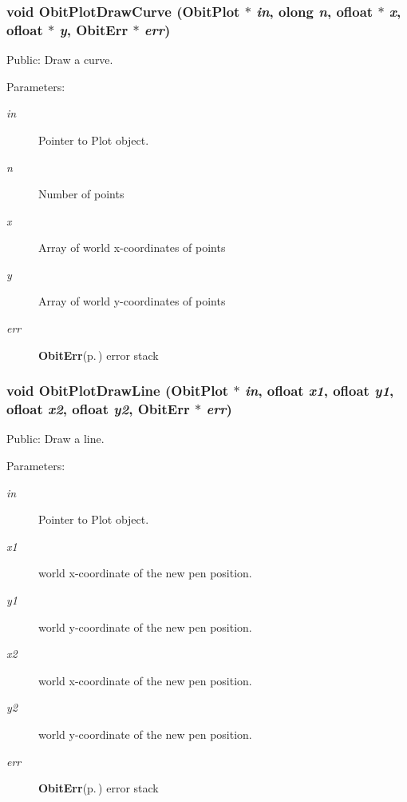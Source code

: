 \subsubsection{\setlength{\rightskip}{0pt plus 5cm}void Obit\-Plot\-Draw\-Curve ({\bf Obit\-Plot} $\ast$ {\em in}, {\bf olong} {\em n}, {\bf ofloat} $\ast$ {\em x}, {\bf ofloat} $\ast$ {\em y}, {\bf Obit\-Err} $\ast$ {\em err})}\label{ObitPlot_8c_a29}


Public: Draw a curve. 

\begin{Desc}
\item[Parameters:]
\begin{description}
\item[{\em in}]Pointer to Plot object. \item[{\em n}]Number of points \item[{\em x}]Array of world x-coordinates of points \item[{\em y}]Array of world y-coordinates of points \item[{\em err}]{\bf Obit\-Err}{\rm (p.\,\pageref{structObitErr})} error stack \end{description}
\end{Desc}
\subsubsection{\setlength{\rightskip}{0pt plus 5cm}void Obit\-Plot\-Draw\-Line ({\bf Obit\-Plot} $\ast$ {\em in}, {\bf ofloat} {\em x1}, {\bf ofloat} {\em y1}, {\bf ofloat} {\em x2}, {\bf ofloat} {\em y2}, {\bf Obit\-Err} $\ast$ {\em err})}\label{ObitPlot_8c_a27}


Public: Draw a line. 

\begin{Desc}
\item[Parameters:]
\begin{description}
\item[{\em in}]Pointer to Plot object. \item[{\em x1}]world x-coordinate of the new pen position. \item[{\em y1}]world y-coordinate of the new pen position. \item[{\em x2}]world x-coordinate of the new pen position. \item[{\em y2}]world y-coordinate of the new pen position. \item[{\em err}]{\bf Obit\-Err}{\rm (p.\,\pageref{structObitErr})} error stack \end{description}
\end{Desc}
